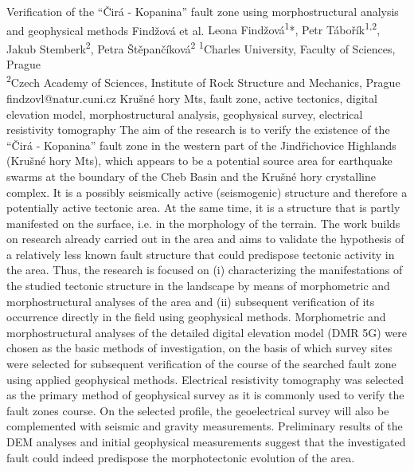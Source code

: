 \abstract
{Verification of the \enquote{Čirá - Kopanina} fault zone using morphostructural analysis and geophysical methods} %
{Findžová et al.} %
{Leona Findžová\textsuperscript{1}*, Petr Tábořík\textsuperscript{1,2}, Jakub Stemberk\textsuperscript{2}, Petra Štěpančíková\textsuperscript{2}} %
{\TLtag} %
{\textsuperscript{1}Charles University, Faculty of Sciences, Prague\\
\textsuperscript{2}Czech Academy of Sciences, Institute of Rock Structure and Mechanics, Prague
} %
{findzovl@natur.cuni.cz}  %
{Krušné hory Mts, fault zone, active tectonics, digital elevation model, morphostructural analysis, geophysical survey, electrical resistivity tomography}%
{The aim of the research is to verify the existence of the \enquote{Čirá - Kopanina} fault zone in the western part of the Jindřichovice Highlands (Krušné hory Mts), which appears to be a potential source area for earthquake swarms at the boundary of the Cheb Basin and the Krušné hory crystalline complex. It is a possibly seismically active (seismogenic) structure and therefore a potentially active tectonic area. At the same time, it is a structure that is partly manifested on the surface, i.e. in the morphology of the terrain. The work builds on research already carried out in the area and aims to validate the hypothesis of a relatively less known fault structure that could predispose tectonic activity in the area. Thus, the research is focused on (i) characterizing the manifestations of the studied tectonic structure in the landscape by means of morphometric and morphostructural analyses of the area and (ii) subsequent verification of its occurrence directly in the field using geophysical methods. Morphometric and morphostructural analyses of the detailed digital elevation model (DMR 5G) were chosen as the basic methods of investigation, on the basis of which survey sites were selected for subsequent verification of the course of the searched fault zone using applied geophysical methods. Electrical resistivity tomography was selected as the primary method of geophysical survey as it is commonly used to verify the fault zones course. On the selected profile, the geoelectrical survey will also be complemented with seismic and gravity measurements. Preliminary results of the DEM analyses and initial geophysical measurements suggest that the investigated fault could indeed predispose the morphotectonic evolution of the area.
}%
{
}%

